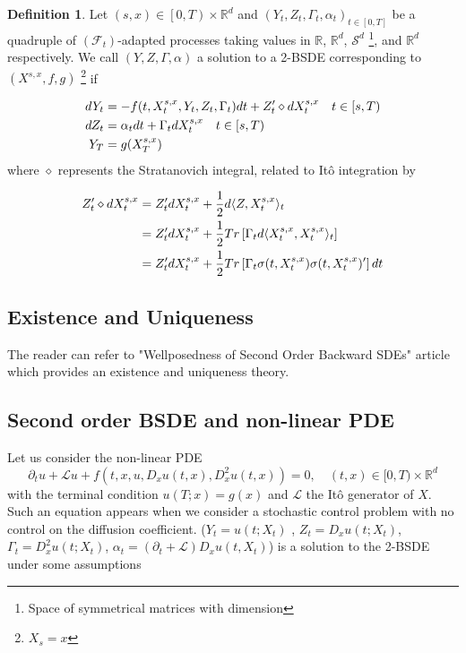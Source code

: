 \documentclass[english,11pt,openany]{article}
\theoremstyle{definition}
\newtheorem{defn}{Definition}[section]
\newcommand{\R}{\mathbb{R}}
\theoremstyle{plain}
\theoremstyle{definition}
\begin{document}
	\begin{defn}
		Let $(s, x) \in \left[0, T\right) \times\R^d$ and $(Y_t, Z_t, \Gamma_t, \alpha_t)_{t\in [0, T]}$ be a quadruple of $(\mathcal{F}_t)$-adapted processes taking values in $\R$, $\R^d$, $\mathcal{S}^d$ \footnote{Space of symmetrical matrices with dimension}, and $\R^d$ respectively. We call $(Y, Z, \Gamma, \alpha)$ a solution to a 2-BSDE corresponding to $(X^{s,x}, f, g)$ \footnote{$X_s = x$} if
		
		\begin{align} \label{2-BSDE}
		dY_t &= - f(t,X_t^{s,x}, Y_t,Z_t, \Gamma_t)dt + Z_t' \diamond dX_t^{s,x} \quad t\in [s, T)\\
		dZ_t &= \alpha_tdt + \Gamma_t dX_t^{s,x} \quad t\in [s, T) \notag\\
		Y_T & = g(X_T^{s,x}) \notag
		\end{align}
		where $\diamond$ represents the Stratanovich integral, related to Itô integration by 
		
		\begin{align}
		Z_t' \diamond dX_t^{s,x} &= Z_t' dX_t^{s,x} + \frac{1}{2}d\langle Z, X_t^{s,x}\rangle_t \notag \\
		&= Z_t' dX_t^{s,x} + \frac{1}{2}Tr\left[\Gamma_t d\langle X_t^{s,x}, X_t^{s,x}\rangle_t \right] \notag \\
		& = Z_t' dX_t^{s,x} + \frac{1}{2}Tr\left[\Gamma_t \sigma(t, X_t^{s,x})\sigma(t, X_t^{s,x})' \right]dt \notag
		\end{align}
		
	\end{defn}
	
	\subsection{Existence and Uniqueness}
	
	The reader can refer to "Wellposedness of Second Order Backward SDEs" \cite{touzi:2BSDE} article which provides an existence and uniqueness theory. 
	
	\subsection{Second order BSDE and non-linear PDE}
	
	Let us consider the non-linear PDE 
	\begin{equation}\label{eq:nonlinearpde}
	\partial_t u + \mathcal{L}u + f(t, x, u, D_xu(t,x), D^2_xu(t,x)) = 0, \quad (t,x)\in [0, T) \times \mathbb{R}^d
	\end{equation}
	with the terminal condition $u(T; x) = g(x)$ and $\mathcal{L}$ the Itô generator of $X$.
	Such an equation appears when we consider a stochastic control problem
	with no control on the diffusion coefficient. 
	($Y_t = u(t;X_t)$ , $Z_t =D_xu(t;X_t)$, $\Gamma_t = D^2_xu(t;X_t)$, $\alpha_t = (\partial_t + \mathcal{L})D_xu(t,X_t)$) is a solution to the 2-BSDE under some assumptions
	
\end{document}
